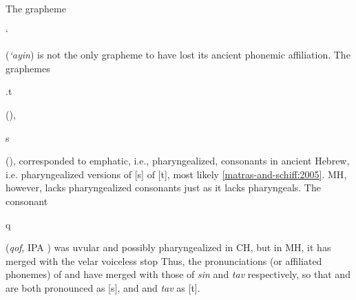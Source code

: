 	
The grapheme \begin{cjhebrew}`\end{cjhebrew} (\textit{`ayin}) is not the only 
grapheme to have 
lost its ancient phonemic affiliation. 
The graphemes \begin{cjhebrew}.t\end{cjhebrew} 
(\textit{}), \begin{cjhebrew}s\end{cjhebrew} 
(\textit{}), corresponded to emphatic, i.e., pharyngealized, consonants in ancient Hebrew, i.e. pharyngealized versions of [s] of [t], most likely \ref{matras-and-schiff:2005}.
\ac{MH}, however, lacks pharyngealized consonants just as it lacks pharyngeals. 
The consonant \begin{cjhebrew}q\end{cjhebrew} (\textit{qof}, IPA \textipa{[q]}) was uvular and 
possibly pharyngealized in \ac{CH}, but in \ac{MH}, it has merged with the velar voiceless stop
 Thus, the pronunciations (or affiliated phonemes) of \textit{} and 
 \textit{} have merged with those of \textit{sin} and \textit{tav} respectively, 
 so that \textit{} and \textit{} are both pronounced as [s], 
 and \textit{} and \textit{tav} as [t].
%

